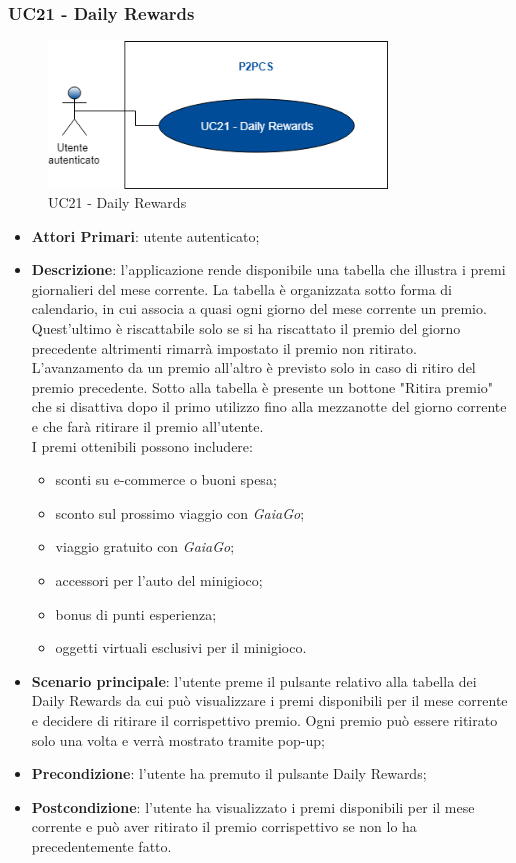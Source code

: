 \subsubsection{UC21 - Daily Rewards}
\begin{figure}[h]
	\includegraphics[width=9cm]{res/images/UC24Daily.png}
	\centering
	\caption{UC21 - Daily Rewards}
\end{figure}
\begin{itemize}
	\item \textbf{Attori Primari}: utente autenticato;
	\item \textbf{Descrizione}: l'applicazione rende disponibile una tabella che illustra i premi giornalieri del mese corrente. La tabella è organizzata sotto forma di calendario, in cui associa a quasi ogni giorno del mese corrente un premio. Quest'ultimo è riscattabile solo se si ha riscattato il premio del giorno precedente altrimenti rimarrà impostato il premio non ritirato. L'avanzamento da un premio all'altro è previsto solo in caso di ritiro del premio precedente. 
	Sotto alla tabella è presente un bottone "Ritira premio" che si disattiva dopo il primo utilizzo fino alla mezzanotte del giorno corrente e che farà ritirare il premio all'utente.\\
	I premi ottenibili possono includere:
	\begin{itemize}
		\item sconti su e-commerce o buoni spesa;
		\item sconto sul prossimo viaggio con \textit{GaiaGo};
		\item viaggio gratuito con \textit{GaiaGo};
		\item accessori per l'auto del minigioco;
		\item bonus di punti esperienza;
		\item oggetti virtuali esclusivi per il minigioco.
	\end{itemize}
	\item \textbf{Scenario principale}: l'utente preme il pulsante relativo alla tabella dei Daily Rewards da cui può visualizzare i premi disponibili per il mese corrente e decidere di ritirare il corrispettivo premio.
	Ogni premio può essere ritirato solo una volta e verrà mostrato tramite pop-up;
	\item \textbf{Precondizione}: l'utente ha premuto il pulsante Daily Rewards;
	\item \textbf{Postcondizione}: l'utente ha visualizzato i premi disponibili per il mese corrente e può aver ritirato il premio corrispettivo se non lo ha precedentemente fatto. 
\end{itemize} 

